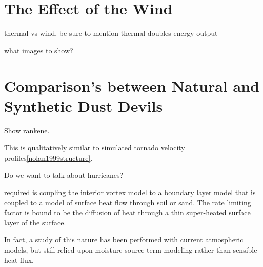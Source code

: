 \section{The Effect of the Wind}
\label{sec:wind_impact}


thermal vs wind, be sure to mention thermal doubles energy output

what images to show?

%
% 

\section{Comparison's between Natural and Synthetic Dust Devils}

Show rankene. 

This is qualitatively similar to simulated tornado velocity
profiles\ref{nolan1999structure}. 



Do we want to talk about hurricanes?


 required is coupling the interior vortex model to a
 boundary layer model that is coupled to a model of surface heat flow
 through soil or sand. The rate limiting factor is bound to be the
 diffusion of heat through a thin super-heated surface layer of
 the surface\cite{emm_comm}.   

In fact, a study of this nature has been performed with current
atmospheric models\cite{emanuel2008hypothesis}, but still relied upon
moisture source term modeling rather than sensible heat flux.   